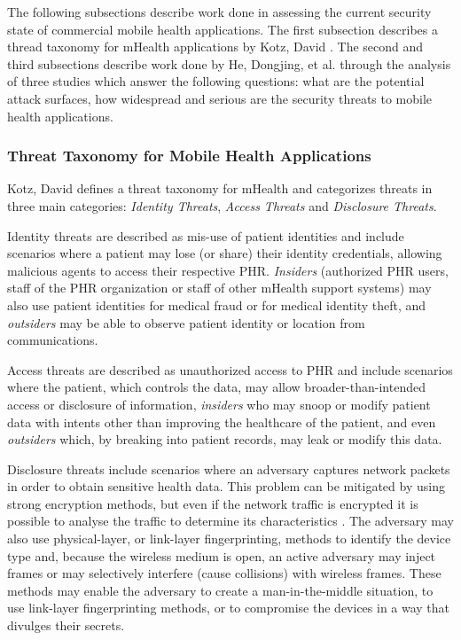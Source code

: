 The following subsections describe work done in assessing the current security state of commercial mobile health applications. The first subsection describes a thread taxonomy for mHealth applications by Kotz, David \cite{kotz2011threat}. The second and third subsections describe work done by He, Dongjing, et al. \cite{he2014security} through the analysis of three studies which answer the following questions: what are the potential attack surfaces, how widespread and serious are the security threats to mobile health applications.

\subsubsection{Threat Taxonomy for Mobile Health Applications}

Kotz, David \cite{kotz2011threat} defines a threat taxonomy for mHealth and categorizes threats in three main categories: \emph{Identity Threats}, \emph{Access Threats} and \emph{Disclosure Threats}.

Identity threats are described as mis-use of patient identities and include scenarios where a patient may lose (or share) their identity credentials, allowing malicious agents to access their respective \ac{PHR}. \emph{Insiders} (authorized \ac{PHR} users, staff of the \ac{PHR} organization or staff of other mHealth support systems) may also use patient identities for medical fraud or for medical identity theft, and \emph{outsiders} may be able to observe patient identity or location from communications.

Access threats are described as unauthorized access to \ac{PHR} and include scenarios where the patient, which controls the data, may allow broader-than-intended access or disclosure of information, \emph{insiders} who may snoop or modify patient data with intents other than improving the healthcare of the patient, and even \emph{outsiders} which, by breaking into patient records, may leak or modify this data.

Disclosure threats include scenarios where an adversary captures network packets in order to obtain sensitive health data. This problem can be mitigated by using strong encryption methods, but even if the network traffic is encrypted it is possible to analyse the traffic to determine its characteristics \cite{wright2006inferring}. The adversary may also use physical-layer, or link-layer fingerprinting, methods to identify the device type and, because the wireless medium is open, an active adversary may inject frames or may selectively interfere (cause collisions) with wireless frames. These methods may enable the adversary to create a man-in-the-middle situation, to use link-layer fingerprinting methods, or to compromise the devices in a way that divulges their secrets.

